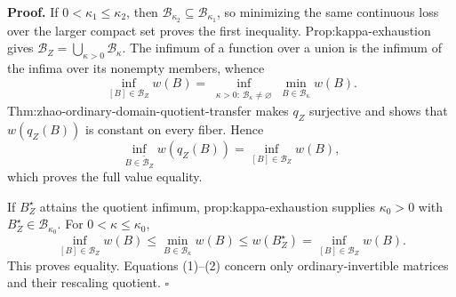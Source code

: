 \textbf{Proof.}
If \(0<\kappa_1\le\kappa_2\), then \(\mathcal B_{\kappa_2}\subseteq\mathcal B_{\kappa_1}\), so minimizing the same continuous loss over the larger compact set proves the first inequality.  Prop:kappa-exhaustion gives \(\mathcal B_Z=\bigcup_{\kappa>0}\mathcal B_\kappa\).  The infimum of a function over a union is the infimum of the infima over its nonempty members, whence
\[
\inf_{[B]\in\mathcal B_Z}w(B)
=\inf_{\substack{\kappa>0:\,\mathcal B_\kappa\ne\varnothing}}
\min_{B\in\mathcal B_\kappa}w(B). \tag{1}
\]
Thm:zhao-ordinary-domain-quotient-transfer makes \(q_Z\) surjective and shows that \(w(q_Z(B))\) is constant on every fiber.  Hence
\[
\inf_{B\in\widetilde{\mathcal B}_Z}w(q_Z(B))
=\inf_{[B]\in\mathcal B_Z}w(B), \tag{2}
\]
which proves the full value equality.

If \(B_Z^\star\) attains the quotient infimum, prop:kappa-exhaustion supplies \(\kappa_0>0\) with \(B_Z^\star\in\mathcal B_{\kappa_0}\).  For \(0<\kappa\le\kappa_0\),
\[
\inf_{[B]\in\mathcal B_Z}w(B)
\le\min_{B\in\mathcal B_\kappa}w(B)
\le w(B_Z^\star)
=\inf_{[B]\in\mathcal B_Z}w(B).
\]
This proves equality.  Equations (1)--(2) concern only ordinary-invertible matrices and their rescaling quotient. \(\square\)
